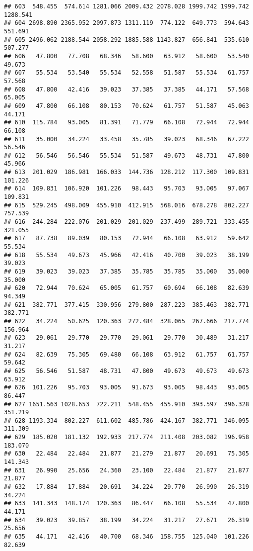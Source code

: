 \documentclass[
]{article}
\begin{document}
\begin{verbatim}
## 603  548.455  574.614 1281.066 2009.432 2078.028 1999.742 1999.742 1288.541
## 604 2698.890 2365.952 2097.873 1311.119  774.122  649.773  594.643  551.691
## 605 2496.062 2188.544 2058.292 1885.588 1143.827  656.841  535.610  507.277
## 606   47.800   77.708   68.346   58.600   63.912   58.600   53.540   49.673
## 607   55.534   53.540   55.534   52.558   51.587   55.534   61.757   57.568
## 608   47.800   42.416   39.023   37.385   37.385   44.171   57.568   65.005
## 609   47.800   66.108   80.153   70.624   61.757   51.587   45.063   44.171
## 610  115.784   93.005   81.391   71.779   66.108   72.944   72.944   66.108
## 611   35.000   34.224   33.458   35.785   39.023   68.346   67.222   56.546
## 612   56.546   56.546   55.534   51.587   49.673   48.731   47.800   45.966
## 613  201.029  186.981  166.033  144.736  128.212  117.300  109.831  101.226
## 614  109.831  106.920  101.226   98.443   95.703   93.005   97.067  109.831
## 615  529.245  498.009  455.910  412.915  568.016  678.278  802.227  757.539
## 616  244.284  222.076  201.029  201.029  237.499  289.721  333.455  321.055
## 617   87.738   89.039   80.153   72.944   66.108   63.912   59.642   55.534
## 618   55.534   49.673   45.966   42.416   40.700   39.023   38.199   39.023
## 619   39.023   39.023   37.385   35.785   35.785   35.000   35.000   35.000
## 620   72.944   70.624   65.005   61.757   60.694   66.108   82.639   94.349
## 621  382.771  377.415  330.956  279.800  287.223  385.463  382.771  382.771
## 622   34.224   50.625  120.363  272.484  328.065  267.666  217.774  156.964
## 623   29.061   29.770   29.770   29.061   29.770   30.489   31.217   31.217
## 624   82.639   75.305   69.480   66.108   63.912   61.757   61.757   59.642
## 625   56.546   51.587   48.731   47.800   49.673   49.673   49.673   63.912
## 626  101.226   95.703   93.005   91.673   93.005   98.443   93.005   86.447
## 627 1651.563 1028.653  722.211  548.455  455.910  393.597  396.328  351.219
## 628 1193.334  802.227  611.602  485.786  424.167  382.771  346.095  311.309
## 629  185.020  181.132  192.933  217.774  211.408  203.082  196.958  183.070
## 630   22.484   22.484   21.877   21.279   21.877   20.691   75.305  141.343
## 631   26.990   25.656   24.360   23.100   22.484   21.877   21.877   21.877
## 632   17.884   17.884   20.691   34.224   29.770   26.990   26.319   34.224
## 633  141.343  148.174  120.363   86.447   66.108   55.534   47.800   44.171
## 634   39.023   39.857   38.199   34.224   31.217   27.671   26.319   25.656
## 635   44.171   42.416   40.700   68.346  158.755  125.040  101.226   82.639

\end{verbatim}
\end{document}
